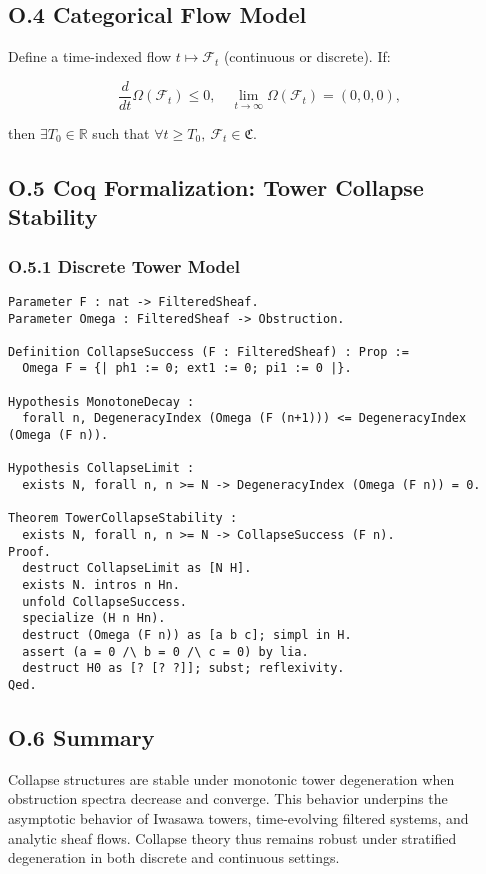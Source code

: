 \documentclass[11pt]{article}
\begin{document}
\subsection*{O.4 Categorical Flow Model}

Define a time-indexed flow \( t \mapsto \mathcal{F}_t \) (continuous or discrete). If:

\[
\frac{d}{dt} \Omega(\mathcal{F}_t) \leq 0,\quad \lim_{t \to \infty} \Omega(\mathcal{F}_t) = (0,0,0),
\]

then \( \exists T_0 \in \mathbb{R} \) such that \( \forall t \geq T_0,\ \mathcal{F}_t \in \mathfrak{C} \).

\subsection*{O.5 Coq Formalization: Tower Collapse Stability}

\subsubsection*{O.5.1 Discrete Tower Model}

\begin{lstlisting}[language=Coq, caption=Collapse Stability in Discrete Tower, captionpos=b]
Parameter F : nat -> FilteredSheaf.
Parameter Omega : FilteredSheaf -> Obstruction.

Definition CollapseSuccess (F : FilteredSheaf) : Prop :=
  Omega F = {| ph1 := 0; ext1 := 0; pi1 := 0 |}.

Hypothesis MonotoneDecay :
  forall n, DegeneracyIndex (Omega (F (n+1))) <= DegeneracyIndex (Omega (F n)).

Hypothesis CollapseLimit :
  exists N, forall n, n >= N -> DegeneracyIndex (Omega (F n)) = 0.

Theorem TowerCollapseStability :
  exists N, forall n, n >= N -> CollapseSuccess (F n).
Proof.
  destruct CollapseLimit as [N H].
  exists N. intros n Hn.
  unfold CollapseSuccess.
  specialize (H n Hn).
  destruct (Omega (F n)) as [a b c]; simpl in H.
  assert (a = 0 /\ b = 0 /\ c = 0) by lia.
  destruct H0 as [? [? ?]]; subst; reflexivity.
Qed.
\end{lstlisting}

\subsection*{O.6 Summary}

Collapse structures are stable under monotonic tower degeneration when obstruction spectra decrease and converge. This behavior underpins the asymptotic behavior of Iwasawa towers, time-evolving filtered systems, and analytic sheaf flows. Collapse theory thus remains robust under stratified degeneration in both discrete and continuous settings.
\end{document}
